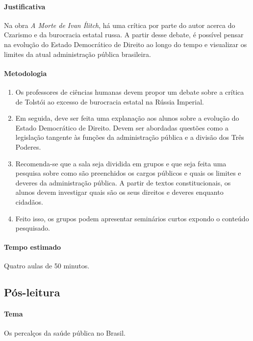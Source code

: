 \documentclass[12pt]{extarticle}
\begin{document}
\paragraph{Justificativa} Na obra \emph{A Morte de Ivan Ílitch}, 
há uma crítica por parte do autor acerca do Czarismo e da burocracia estatal russa.
A partir desse debate, é possível pensar na evolução do Estado Democrático
de Direito ao longo do tempo e visualizar os limites da atual administração
pública brasileira.

\paragraph{Metodologia}

\begin{enumerate}

\item Os professores de ciências humanas devem propor um debate sobre
a crítica de Tolstói ao excesso de burocracia estatal na Rússia Imperial.

\item Em seguida, deve ser feita uma explanação aos alunos sobre a
evolução do Estado Democrático de Direito. Devem ser abordadas questões
como a legislação tangente às funções da administração
pública e a divisão dos Três Poderes.

\item Recomenda-se que a sala seja dividida em grupos e que seja
feita uma pesquisa sobre como são preenchidos os cargos públicos
e quais os limites e deveres da administração pública.
A partir de textos constitucionais, os alunos devem investigar quais
são os seus direitos e deveres enquanto cidadãos.

\item Feito isso, os grupos podem apresentar seminários curtos expondo o
conteúdo pesquisado.

\end{enumerate}

\paragraph{Tempo estimado} Quatro aulas de 50 minutos.


\subsection{Pós-leitura}

\paragraph{Tema} Os percalços da saúde pública no Brasil.
\end{document}
